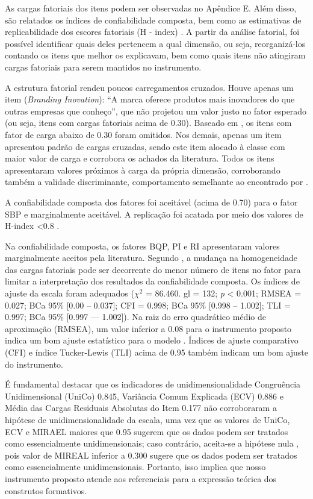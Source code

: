 As cargas fatoriais dos itens podem ser observadas no Apêndice E.  Além disso, são relatados os índices de confiabilidade composta, bem como as estimativas de replicabilidade dos escores fatoriais (H - index) \cite{Ferrando2018AssessingAnalysis}. A partir da análise fatorial, foi possível identificar quais deles pertencem a qual dimensão, ou seja, reorganizá-los contando os itens que melhor os explicavam, bem como quais itens não atingiram cargas fatoriais para serem mantidos no instrumento.

A estrutura fatorial rendeu poucos carregamentos cruzados. Houve apenas um item (\textit{Branding Inovation}): “A marca oferece produtos mais inovadores do que outras empresas que conheço”, que não projetou um valor justo no fator esperado (ou seja, itens com cargas fatoriais acima de 0.30). Baseado em , os itens com fator de carga abaixo de 0.30 foram omitidos. Nos demais, apenas um item apresentou padrão de cargas cruzadas, sendo este item alocado à classe com maior valor de carga e corrobora os achados da literatura. Todos os itens apresentaram valores próximos à carga da própria dimensão, corroborando também a validade discriminante, comportamento semelhante ao encontrado por .

A confiabilidade composta dos fatores foi aceitável (acima de 0.70) para o fator SBP e marginalmente aceitável. A replicação foi acatada por meio dos valores de H-index <0.8 \cite{Ferrando2018AssessingAnalysis}.

Na confiabilidade composta, os fatores BQP, PI e RI apresentaram valores marginalmente aceitos pela literatura. Segundo , a mudança na homogeneidade das cargas fatoriais pode ser decorrente do menor número de itens no fator para limitar a interpretação dos resultados da confiabilidade composta.
Os índices de ajuste da escala foram adequados (${\chi}^2$ = 86.460. gl = 132; \textit{p} < 0.001; RMSEA = 0.027; BCa 95\% [0.00 – 0.037]; CFI = 0.998; BCa 95\% [0.998 – 1.002]; TLI = 0.997; BCa 95\% [0.997 — 1.002]). Na raiz do erro quadrático médio de aproximação (RMSEA), um valor inferior a 0.08 para o instrumento proposto indica um bom ajuste estatístico para o modelo \cite{Tucker1973AAnalysis,West2012ModelModeling}. Índices de ajuste comparativo (CFI) e índice Tucker-Lewis (TLI) acima de 0.95 também indicam um bom ajuste do instrumento.

É fundamental destacar que os indicadores de unidimensionalidade Congruência Unidimensional (UniCo) 0.845, Variância Comum Explicada (ECV) 0.886 e Média das Cargas Residuais Absolutas do Item 0.177 não corroboraram a hipótese de unidimensionalidade da escala, uma vez que os valores de UniCo, ECV e MIRAEL maiores que 0.95 sugerem que os dados podem ser tratados como essencialmente unidimensionais; caso contrário, aceita-se a hipótese nula \cite{Ferrando2017}, pois valor de MIREAL inferior a 0.300 sugere que os dados podem ser tratados como essencialmente unidimensionais. Portanto, isso implica que nosso instrumento proposto atende aos referenciais para a expressão teórica dos construtos formativos.

